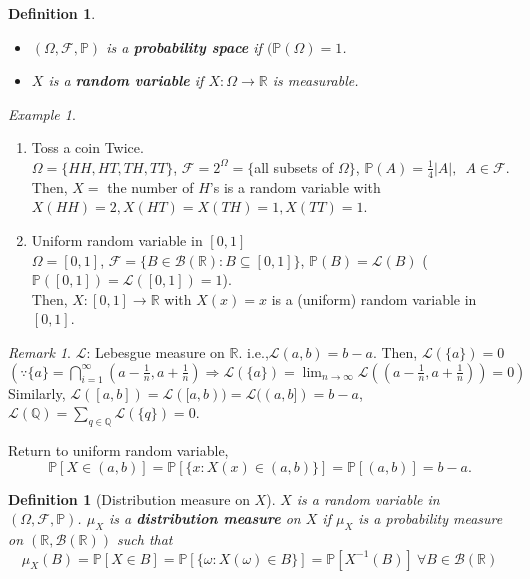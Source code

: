 \documentclass[12pt]{report}
\renewcommand{\1}{\mathbb{1}}
\renewcommand{\subset}{\subseteq}
\theoremstyle{break}
\theoremstyle{newdef}
\newtheorem{defn}[thm]{Definition} %
\theoremstyle{remark}
\newtheorem*{exmp}{Example} %
\newtheorem*{rem}{Remark} %
\begin{document}
\begin{defn}
\leavevmode
\vspace{-6mm}
\begin{itemize}
\item $(\Omega, \mathcal{F}, \mathbb{P})$ is a \textbf{probability space} if $(\mathbb{P}(\Omega) = 1$.
\item $X$ is a \textbf{random variable} if $X : \Omega \rightarrow \mathbb{R}$ is measurable.
\end{itemize}
\end{defn}

\begin{exmp}
\leavevmode
\begin{enumerate}
\item Toss a coin Twice.\\
$\Omega = \{HH,HT,TH,TT\}$,
$\mathcal{F} = 2^\Omega = \{$all subsets of $\Omega\}$,
$\mathbb{P}(A) = \frac{1}{4}|A|, \enspace A \in \mathcal{F}$.\\
Then, $X = $ the number of $H$'s is a random variable with $X(HH) = 2, X(HT)=X(TH)=1, X(TT)=1$.

\item Uniform random variable in $[0,1]$\\
$\Omega=  [0,1]$,
$\mathcal{F} = \{B \in \mathcal{B}(\mathbb{R}) : B \subset [0,1]\}$,
$\mathbb{P}(B) = \mathcal{L}(B)$ ($\mathbb{P}([0,1]) = \mathcal{L}([0,1]) = 1$).\\
Then, $X : [0,1] \rightarrow \mathbb{R}$ with $X(x) = x$ is a (uniform) random variable in $[0,1]$.
\end{enumerate}
\end{exmp}


\begin{rem}
$\mathcal{L}$: Lebesgue measure on $\mathbb{R}$. i.e.,$\mathcal{L}(a,b) = b-a$.
Then, $\mathcal{L}(\{a\}) = 0$\\
$(\because
\{a\} = \bigcap_{i=1}^\infty (a-\frac{1}{n}, a+\frac{1}{n})
\Rightarrow \mathcal{L}(\{a\}) = \lim_{n\rightarrow\infty} \mathcal{L}((a-\frac{1}{n}, a+\frac{1}{n})) = 0
)$\\
Similarly, $\mathcal{L}([a,b]) = \mathcal{L}([a,b)) = \mathcal{L}((a,b]) = b-a$,
$\mathcal{L}(\mathbb{Q}) = \sum_{q \in \mathbb{Q}}\mathcal{L}(\{q\}) = 0$.
\end{rem}

Return to uniform random variable,
$$\mathbb{P}[X \in (a,b)] = \mathbb{P}[\{x : X(x) \in (a,b)\}] = \mathbb{P}[(a,b)] = b-a.$$

\begin{defn}[Distribution measure on $X$]
$X$ is a random variable in $(\Omega, \mathcal{F}, \mathbb{P})$.
$\mu_X$ is a \textbf{distribution measure} on $X$ if $\mu_X$ is a probability measure on $(\mathbb{R}, \mathcal{B}(\mathbb{R}))$ such that 
$$
\mu_X(B) = \mathbb{P}[X \in B]
= \mathbb{P}[\{\omega : X(\omega) \in B\}]
= \mathbb{P}[X^{-1}(B)] \ \forall B \in \mathcal{B}(\mathbb{R})
$$
\end{defn}
\end{document}
